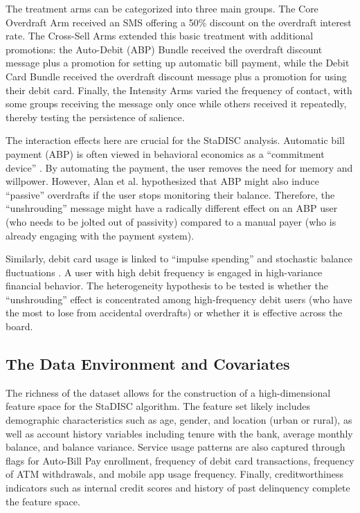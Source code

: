 \documentclass[11pt,a4paper]{article}
\begin{document}
	The treatment arms can be categorized into three main groups. The Core Overdraft Arm received an SMS offering a 50\% discount on the overdraft interest rate. The Cross-Sell Arms extended this basic treatment with additional promotions: the Auto-Debit (ABP) Bundle received the overdraft discount message plus a promotion for setting up automatic bill payment, while the Debit Card Bundle received the overdraft discount message plus a promotion for using their debit card. Finally, the Intensity Arms varied the frequency of contact, with some groups receiving the message only once while others received it repeatedly, thereby testing the persistence of salience.
	
	The interaction effects here are crucial for the StaDISC analysis. Automatic bill payment (ABP) is often viewed in behavioral economics as a ``commitment device'' \citep{bryan2010}. By automating the payment, the user removes the need for memory and willpower. However, Alan et al. hypothesized that ABP might also induce ``passive'' overdrafts if the user stops monitoring their balance. Therefore, the ``unshrouding'' message might have a radically different effect on an ABP user (who needs to be jolted out of passivity) compared to a manual payer (who is already engaging with the payment system).
	
	Similarly, debit card usage is linked to ``impulse spending'' and stochastic balance fluctuations \citep{prelec1998}. A user with high debit frequency is engaged in high-variance financial behavior. The heterogeneity hypothesis to be tested is whether the ``unshrouding'' effect is concentrated among high-frequency debit users (who have the most to lose from accidental overdrafts) or whether it is effective across the board.
	
	\subsection{The Data Environment and Covariates}
	The richness of the dataset allows for the construction of a high-dimensional feature space for the StaDISC algorithm. The feature set likely includes demographic characteristics such as age, gender, and location (urban or rural), as well as account history variables including tenure with the bank, average monthly balance, and balance variance. Service usage patterns are also captured through flags for Auto-Bill Pay enrollment, frequency of debit card transactions, frequency of ATM withdrawals, and mobile app usage frequency. Finally, creditworthiness indicators such as internal credit scores and history of past delinquency complete the feature space.
	
\end{document}
